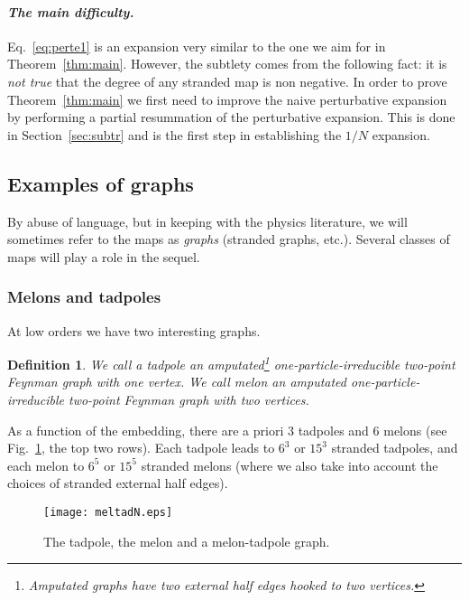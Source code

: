 \documentclass[10pt]{article}
\theoremstyle{plain}
\newtheorem{definition}{Definition}
\theoremstyle{definition}
\begin{document}
\paragraph{\it The main difficulty.}   Eq.~\eqref{eq:perte1} is an expansion very similar to the one we aim for in Theorem~\ref{thm:main}. However, 
the subtlety comes from the following fact: it is \emph{not true} that the 
 degree of any stranded map is non negative. In order to prove Theorem~\ref{thm:main}
 we first need to improve the naive perturbative expansion by performing a partial resummation of the perturbative expansion. This 
is done in Section~\ref{sec:subtr} and is the first step in establishing the $1/N$ expansion.

 \subsection{Examples of graphs}
 \label{sec:graphs-ex}
 
By abuse of language, but in keeping with the physics literature, we will sometimes refer to the maps as \emph{graphs} (stranded graphs, etc.). 
Several classes of maps will play a role in the sequel. 


\subsubsection{Melons and tadpoles}\label{sec:cores}

At low orders we have two interesting graphs.
\begin{definition}
 We call a \emph{tadpole} an amputated\footnote{Amputated graphs have two external half edges hooked to two vertices.} one-particle-irreducible two-point Feynman graph with one vertex. We call \emph{melon}
 an amputated one-particle-irreducible two-point Feynman graph with two vertices.
\end{definition}

As a function of the embedding, there are a priori $3$ tadpoles and $6$ melons (see Fig.~\ref{fig:meltad}, the top two rows). Each tadpole leads to $6^3$ or $15^3$ stranded tadpoles, 
and each melon to $6^5$ or $15^5$ stranded melons (where we also take into account the choices of stranded external half edges).
   \begin{figure}[htb]
 \begin{center}
 \texttt{[image: meltadN.eps]}  
 \caption{The tadpole, the melon and a melon-tadpole graph.}\label{fig:meltad}
 \end{center}
 \end{figure}
\end{document}
